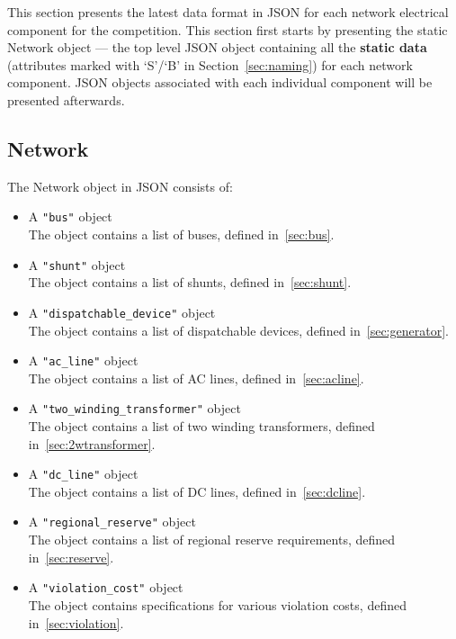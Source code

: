 This section presents the latest data format in JSON for 
each network electrical component for the competition.
This section first starts by presenting the static Network object ---
the top level JSON object containing all the \textbf{static data}
(attributes marked with `S'/`B' in Section~\ref{sec:naming}) for each network component.
JSON objects associated with each individual component will be presented afterwards.

\subsection{Network}
\label{sec:network}
The Network object in JSON consists of: 
\begin{itemize}
    \item A \texttt{"bus"} object\\
    The object contains a list of buses, defined in~\ref{sec:bus}.
    \item A \texttt{"shunt"} object\\
    The object contains a list of shunts, defined in~\ref{sec:shunt}.
    \item A \texttt{"dispatchable\_device"} object\\
    The object contains a list of dispatchable devices, defined in~\ref{sec:generator}.
    \item A \texttt{"ac\_line"} object\\
    The object contains a list of AC lines, defined in~\ref{sec:acline}.
    \item A \texttt{"two\_winding\_transformer"} object\\
    The object contains a list of two winding transformers, defined in~\ref{sec:2wtransformer}.
    \item A \texttt{"dc\_line"} object\\
    The object contains a list of DC lines, defined in~\ref{sec:dcline}.
    \item A \texttt{"regional\_reserve"} object\\
    The object contains a list of regional reserve requirements, defined in~\ref{sec:reserve}.
    \item A \texttt{"violation\_cost"} object\\
    The object contains specifications for various violation costs, defined in~\ref{sec:violation}.
\end{itemize}

